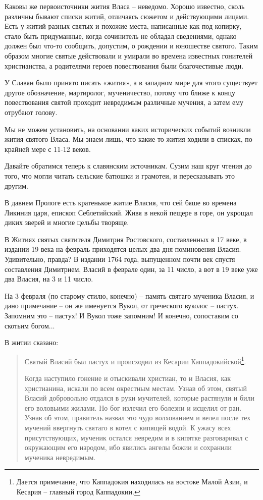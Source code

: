 \documentclass[a5paper,11pt,openany]{article}
\begin{document}
  Каковы же первоисточники жития Власа – неведомо. Хорошо известно, сколь различны бывают списки житий, отличаясь сюжетом и действующими лицами. Есть у житий разных святых и похожие места, написанные как под копирку, стало быть придуманные, когда сочинитель не обладал сведениями, однако должен был что-то сообщить, допустим, о рождении и юношестве святого. Таким образом многие святые действовали и умирали во времена известных гонителей христианства, а родителями героев повествования были благочестивые люди. 

  У Славян было принято писать «жития», а в западном мире для этого существует другое обозначение, мартиролог, мученичество, потому что ближе к концу повествования святой проходит невредимым различные мучения, а затем ему отрубают голову.

    Мы не можем установить, на основании каких исторических событий возникли жития святого Власа. Мы знаем лишь, что какие-то жития ходили в списках, по крайней мере с 11-12 веков.

   Давайте обратимся теперь к славянским источникам. Сузим наш круг чтения до того, что могли читать сельские батюшки и грамотеи, и пересказывать это другим.

    В давнем Прологе есть кратенькое житие Власия, что сей бяше во времена Ликиния царя, епископ Себлетийский. Живя в некой пещере в горе, он укрощал диких зверей и многие цельбы творяще.

  В Житиях святых святителя Димитрия Ростовского, составленных в 17 веке, в издании 19 века на февраль приходятся целых два дня поминовения Власия. Удивительно, правда? В издании 1764 года, выпущенном почти век спустя составления Димитрием, Власий в феврале один, за 11 число, а вот в 19 веке уже два Власия, на 3 и 11 число.


   На 3 февраля (по старому стилю, конечно) – память святаго мученика Власия, и дано примечание – он же именуется Вукол, от греческого вуколос – пастух. Запомним это – пастух! И Вукол тоже запомним! И конечно, сопоставим со скотьим богом...

   В житии сказано:

\begin{quotation}
\noindent Святый Власий был пастух и происходил из Кесарии Каппадокийской\footnote{Дается примечание, что Каппадокия находилась на востоке Малой Азии, и Кесария – главный город Каппадокии.}.

   Когда наступило гонение и отыскивали христиан, то и Власия, как христианина, искали по всем окрестным местам. Узнав об этом, святый Власий добровольно отдался в руки мучителей, которые растянули и били его воловьими жилами. Но бог излечил его болезни и исцелил от ран. Узнав об этом, правитель назвал это чудо волхованием и велел после тех мучений ввергнуть святаго в котел с кипящей водой. К ужасу всех присутствующих, мученик остался невредим и в кипятке разговаривал с окружающим его народом, ибо явились ангелы божии и сохранили мученика невредимым.\end{quotation} 
\end{document}
